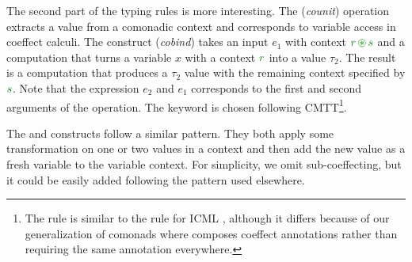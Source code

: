 The second part of the typing rules is more interesting. The (\emph{counit}) operation extracts
a value from a comonadic context and corresponds to variable access in coeffect calculi. The
 construct (\emph{cobind}) takes an input $e_1$ with context $\cclrd{r}\,\cseq\,\cclrd{s}$
and a computation that turns a variable $x$ with a context $\cclrd{r}$ into a value $\tau_2$.
The result is a computation that produces a $\tau_2$ value with the remaining context specified
by $\cclrd{s}$. Note that the expression $e_2$ and $e_1$ corresponds to the first and second
arguments of the  operation. The keyword  is chosen following 
CMTT\footnote{The rule is similar to the  rule for ICML \cite[p. 14]{logic-cmtt},
although it differs because of our generalization of comonads where  composes
coeffect annotations rather than requiring the same annotation everywhere.}.

The  and  constructs follow a similar pattern. They both apply some 
transformation on one or two values in a context and then add the new value as a fresh variable
to the variable context. For simplicity, we omit sub-coeffecting, but it could be easily added 
following the pattern used elsewhere.


